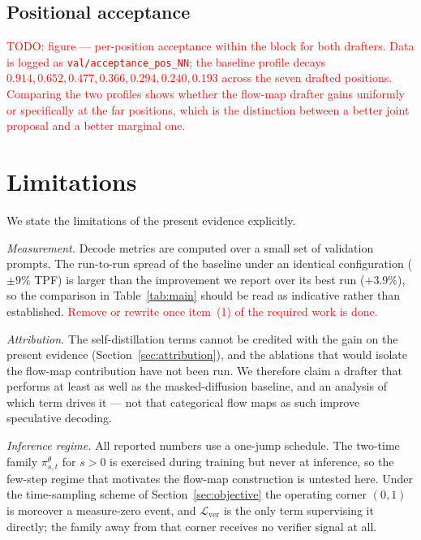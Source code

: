 \documentclass{zapiski}
\newcommand{\cm}[1]{\textcolor{red}{#1}}
\newcommand{\pmap}[2]{\pi^{\theta}_{#1,#2}}
\begin{document}
\subsection{Positional acceptance}

\cm{TODO: figure --- per-position acceptance within the block for both
drafters. Data is logged as \texttt{val/acceptance\_pos\_NN}; the baseline
profile decays $0.914, 0.652, 0.477, 0.366, 0.294, 0.240, 0.193$ across the
seven drafted positions. Comparing the two profiles shows whether the flow-map
drafter gains uniformly or specifically at the far positions, which is the
distinction between a better joint proposal and a better marginal one.}

\section{Limitations}
\label{sec:limitations}

We state the limitations of the present evidence explicitly.

\emph{Measurement.} Decode metrics are computed over a small set of validation
prompts. The run-to-run spread of the baseline under an identical configuration
($\pm 9\%$ TPF) is larger than the improvement we report over its best run
($+3.9\%$), so the comparison in Table~\ref{tab:main} should be read as
indicative rather than established. \cm{Remove or rewrite once item~(1) of the
required work is done.}

\emph{Attribution.} The self-distillation terms cannot be credited with the
gain on the present evidence (Section~\ref{sec:attribution}), and the ablations
that would isolate the flow-map contribution have not been run. We therefore
claim a drafter that performs at least as well as the masked-diffusion
baseline, and an analysis of which term drives it --- not that categorical flow
maps as such improve speculative decoding.

\emph{Inference regime.} All reported numbers use a one-jump schedule. The
two-time family $\pmap{s}{t}$ for $s>0$ is exercised during training but never
at inference, so the few-step regime that motivates the flow-map construction
is untested here. Under the time-sampling scheme of
Section~\ref{sec:objective} the operating corner $(0,1)$ is moreover a
measure-zero event, and $\mathcal{L}_{\mathrm{ver}}$ is the only term
supervising it directly; the family away from that corner receives no verifier
signal at all.
\end{document}
